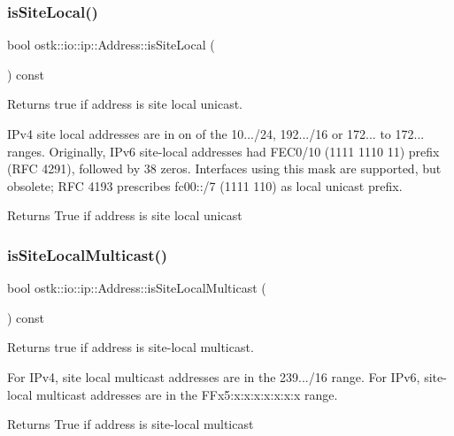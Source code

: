 \subsubsection{\texorpdfstring{is\+Site\+Local()}{isSiteLocal()}}
{\footnotesize\ttfamily bool ostk\+::io\+::ip\+::\+Address\+::is\+Site\+Local (\begin{DoxyParamCaption}{ }\end{DoxyParamCaption}) const}



Returns true if address is site local unicast. 

I\+Pv4 site local addresses are in on of the 10.../24, 192.../16 or 172... to 172... ranges. Originally, I\+Pv6 site-\/local addresses had F\+E\+C0/10 (1111 1110 11) prefix (R\+FC 4291), followed by 38 zeros. Interfaces using this mask are supported, but obsolete; R\+FC 4193 prescribes fc00\+:\+:/7 (1111 110) as local unicast prefix.

\begin{DoxyReturn}{Returns}
True if address is site local unicast 
\end{DoxyReturn}
\mbox{\label{classostk_1_1io_1_1ip_1_1_address_a44e4d6cf1714b01dbb0d4b7042ad8366}} 
\subsubsection{\texorpdfstring{is\+Site\+Local\+Multicast()}{isSiteLocalMulticast()}}
{\footnotesize\ttfamily bool ostk\+::io\+::ip\+::\+Address\+::is\+Site\+Local\+Multicast (\begin{DoxyParamCaption}{ }\end{DoxyParamCaption}) const}



Returns true if address is site-\/local multicast. 

For I\+Pv4, site local multicast addresses are in the 239.../16 range. For I\+Pv6, site-\/local multicast addresses are in the F\+Fx5\+:x\+:x\+:x\+:x\+:x\+:x\+:x range.

\begin{DoxyReturn}{Returns}
True if address is site-\/local multicast 
\end{DoxyReturn}
\mbox{\label{classostk_1_1io_1_1ip_1_1_address_a5e8adc78088668c77ab9ddf486892a85}} 
